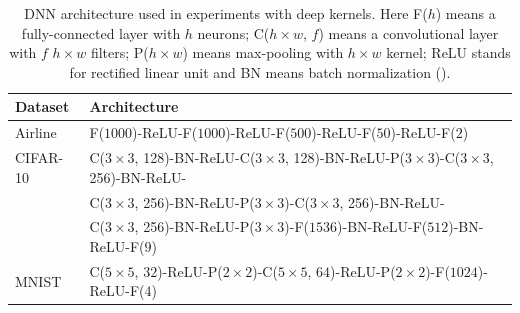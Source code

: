   \begin{table}[!t]
    \caption{DNN architecture used in experiments with deep kernels. Here F($h$) means a fully-connected layer with $h$ neurons; C($h{\times}w$, $f$) means a
    convolutional layer with $f$ $h{\times}w$ filters; P($h{\times}w$) means max-pooling with $h{\times}w$ kernel; ReLU stands for rectified linear unit
    and BN means batch normalization (\citet{ioffe2015}).}
    \label{deep_architecture}
    \centering
    \begin{tabular}{ll}
      \toprule
      Dataset & Architecture \\
      \midrule

      Airline & F($1000$)-ReLU-F($1000$)-ReLU-F($500$)-ReLU-F($50$)-ReLU-F($2$)\\

      CIFAR-10 & C($3{\times}3$, 128)-BN-ReLU-C($3{\times}3$, 128)-BN-ReLU-P($3{\times}3$)-C($3{\times}3$, 256)-BN-ReLU-\\
       & C($3{\times}3$, 256)-BN-ReLU-P($3{\times}3$)-C($3{\times}3$, 256)-BN-ReLU-\\
       & C($3{\times}3$, 256)-BN-ReLU-P($3{\times}3$)-F($1536$)-BN-ReLU-F($512$)-BN-ReLU-F($9$)\\

      MNIST & C($5{\times}5$, $32$)-ReLU-P($2{\times}2$)-C($5{\times}5$, $64$)-ReLU-P($2{\times}2$)-F($1024$)-ReLU-F($4$)\\
      \bottomrule
    \end{tabular}
  \end{table}
  
